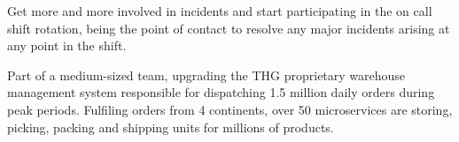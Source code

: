 \begin{cventries}
{\begin{cvitems}
        \item{Get more and more involved in incidents and start participating in the on call shift rotation, being the point of contact to resolve any major incidents arising at any point in the shift.}
        \item{Part of a medium-sized team, upgrading the THG proprietary warehouse management system responsible for dispatching 1.5 million daily orders during peak periods. Fulfiling orders from 4 continents, over 50 microservices are storing, picking, packing and shipping units for millions of products.}
  \end{cvitems}
  }

\end{cventries}
